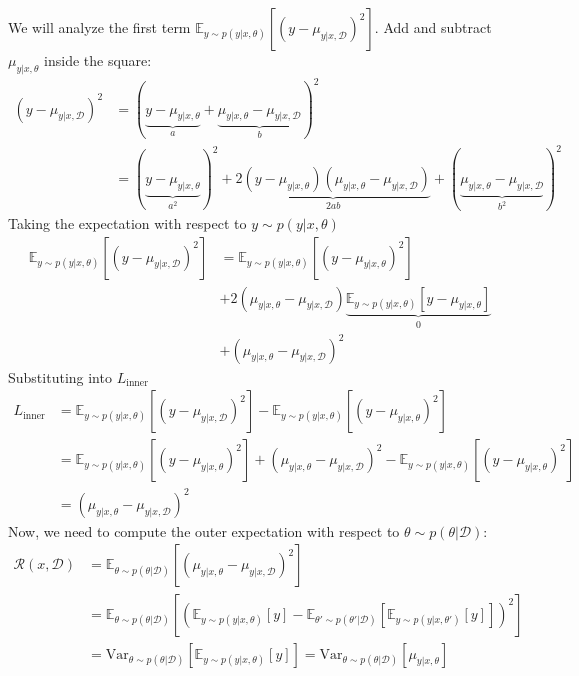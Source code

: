 We will analyze the first term $\mathbb{E}_{y \sim p(y|x, \theta)}[(y - \mu_{y|x,\mathcal{D}})^2]$. Add and subtract $\mu_{y|x,\theta}$ inside the square:
\begin{align}
(y - \mu_{y|x,\mathcal{D}})^2 &= (\underbrace{y - \mu_{y|x,\theta}}_{a} + \underbrace{\mu_{y|x,\theta} - \mu_{y|x,\mathcal{D}}}_{b})^2 \\
&= (\underbrace{y - \mu_{y|x,\theta}}_{a^2})^2 + \underbrace{2(y - \mu_{y|x,\theta})(\mu_{y|x,\theta} - \mu_{y|x,\mathcal{D}})}_{2ab} + (\underbrace{\mu_{y|x,\theta} - \mu_{y|x,\mathcal{D}}}_{b^2})^2
\nonumber
\end{align}
Taking the expectation with respect to $y \sim p(y|x, \theta)$
\begin{align}
\mathbb{E}_{y \sim p(y|x, \theta)}[(y - \mu_{y|x,\mathcal{D}})^2] &= \mathbb{E}_{y \sim p(y|x, \theta)}[(y - \mu_{y|x,\theta})^2] \\
&+ 2(\mu_{y|x,\theta} - \mu_{y|x,\mathcal{D}})\underbrace{\mathbb{E}_{y \sim p(y|x, \theta)}[y - \mu_{y|x,\theta}]}_{0} \nonumber \\
&+ (\mu_{y|x,\theta} - \mu_{y|x,\mathcal{D}})^2 \nonumber
\end{align}
Substituting into $L_{\text{inner}}$
\begin{align}
L_{\text{inner}}&= \mathbb{E}_{y \sim p(y|x, \theta)} \left[ (y - \mu_{y|x,\mathcal{D}})^2\right] - \mathbb{E}_{y \sim p(y|x, \theta)} \left[(y - \mu_{y|x,\theta})^2 \right] \\
&= \mathbb{E}_{y \sim p(y|x, \theta)}[(y - \mu_{y|x,\theta})^2] + (\mu_{y|x,\theta} - \mu_{y|x,\mathcal{D}})^2 - \mathbb{E}_{y \sim p(y|x, \theta)} \left[(y - \mu_{y|x,\theta})^2 \right] \nonumber \\ 
&=(\mu_{y|x,\theta} - \mu_{y|x,\mathcal{D}})^2 \nonumber
\end{align}
Now, we need to compute the outer expectation with respect to $\theta \sim p(\theta|\mathcal{D})$:
\begin{align}
\mathcal{R}(x, \mathcal{D}) &= \mathbb{E}_{\theta \sim p(\theta|\mathcal{D})} \left[(\mu_{y|x,\theta} - \mu_{y|x,\mathcal{D}})^2 \right] \\
&= \mathbb{E}_{\theta \sim p(\theta|\mathcal{D})} \left[ \left( \mathbb{E}_{y \sim p(y|x, \theta)}[y] - \mathbb{E}_{\theta'\sim p(\theta'|\mathcal{D})}\left[ \mathbb{E}_{y \sim p(y|x, \theta')}[y] \right]\right)^2 \right] \nonumber\\
&= \text{Var}_{\theta \sim p(\theta|\mathcal{D})} \left[ \mathbb{E}_{y \sim p(y|x,\theta)}[y] \right] = \boxed{\text{Var}_{\theta \sim p(\theta|\mathcal{D})}  \left[ \mu_{y|x,\theta} \right]} \nonumber
\end{align}

